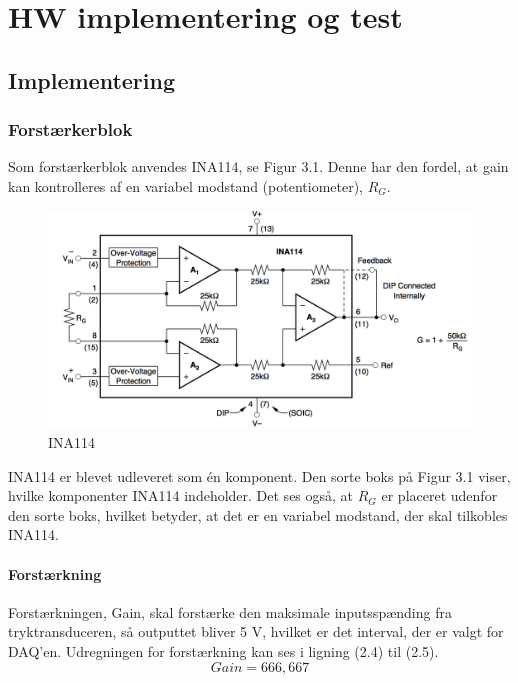 \chapter{HW implementering og test}

\section{Implementering}

\subsection{Forstærkerblok}
Som forstærkerblok anvendes INA114, se Figur 3.1. Denne har den fordel, at gain kan kontrolleres af en variabel modstand (potentiometer), $R_{G}$. 

\begin{figure}[H]
	\centering
	\includegraphics[width=1\textwidth]{Figurer/Snip20151117_104}
	\caption{INA114}
\end{figure}

INA114 er blevet udleveret som én komponent. Den sorte boks på Figur 3.1 viser, hvilke komponenter INA114 indeholder. Det ses også, at $R_{G}$ er placeret udenfor den sorte boks, hvilket betyder, at det er en variabel modstand, der skal tilkobles INA114.     

\subsubsection{Forstærkning}
Forstærkningen, Gain, skal forstærke den maksimale inputsspænding fra tryktransduceren, så outputtet bliver 5 V, hvilket er det interval, der er valgt for DAQ'en. Udregningen for forstærkning kan ses i ligning (2.4) til (2.5).
\begin{equation}
	Gain = 666,667
\end{equation}


